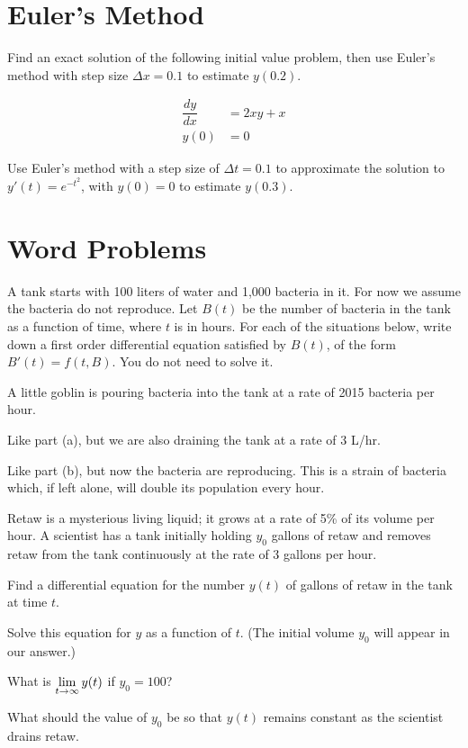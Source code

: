 \documentclass{article}
\begin{document}
\newpage

\section*{Euler's Method}

\Prob Find an exact solution of the following initial value problem, then use Euler's method with step size $\Delta x = 0.1$ to estimate $y(0.2)$.\vspace{-0.2cm}

\begin{align*}
	\dfrac{dy}{dx} &= 2xy + x \\
	y(0) &= 0
\end{align*}

\vfill

\Prob Use Euler's method with a step size of $\Delta t = 0.1$ to approximate the solution to $y'(t) = e^{-t^2}$, with $y(0) = 0$ to estimate $y(0.3)$.\vfill

\newpage

\section*{Word Problems}

\Prob A tank starts with 100 liters of water and 1,000 bacteria in it. For now we assume the bacteria do not reproduce. Let $B(t)$ be the number of bacteria in the tank as a function of time, where $t$ is in hours. For each of the situations below, write down a first order differential equation satisfied by $B(t)$, of the form $B'(t) = f(t,B)$. You do not need to solve it.\vspace{0.5cm}

\subprob A little goblin is pouring bacteria into the tank at a rate of 2015 bacteria per hour. \vfill

\subprob Like part (a), but we are also draining the tank at a rate of 3 L/hr.\vfill

\subprob Like part (b), but now the bacteria are reproducing.  This is a strain of bacteria which, if left alone, will double its population every hour.\vfill

\newpage

\Prob Retaw is a mysterious living liquid; it grows at a rate of 5\% of its volume per hour.  A scientist has a tank initially holding $y_0$ gallons of retaw and removes retaw from the tank continuously at the rate of 3 gallons per hour.\vspace{0.5cm}

\subprob Find a differential equation for the number $y(t)$ of gallons of retaw in the tank at time $t$.\vfill

\subprob Solve this equation for $y$ as a function of $t$.  (The initial volume $y_0$ will appear in our answer.)\vfill

\subprob What is $\displaystyle\lim_{t \to \infty} y(t)$ if $y_0 = 100$?\vfill

\subprob What should the value of $y_0$ be so that $y(t)$ remains constant as the scientist drains retaw.\vfill
\end{document}
